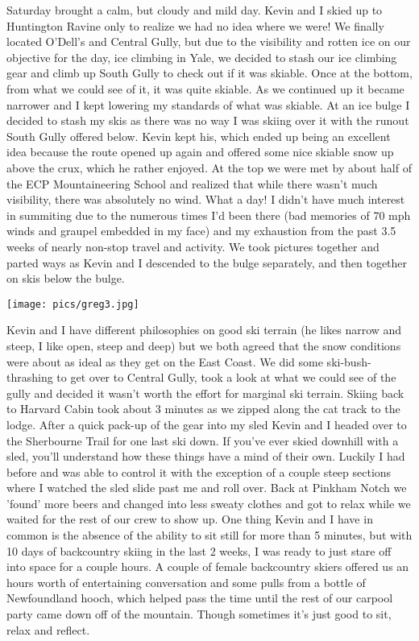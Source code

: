 \documentclass[10pt,a4paper]{article}
\newenvironment{Figure}
  {\par\medskip\noindent\minipage{\linewidth}}
  {\endminipage\par\medskip}
\begin{document}
\begin{multicols}{2}
 
Saturday brought a calm, but cloudy and mild day.  Kevin and I skied up to Huntington Ravine only to realize we had no idea where we were!  We finally located O'Dell's and Central Gully, but due to the visibility and rotten ice on our objective for the day, ice climbing in Yale, we decided to stash our ice climbing gear and climb up South Gully to check out if it was skiable.  Once at the bottom, from what we could see of it, it was quite skiable.  As we continued up it became narrower and I kept lowering my standards of what was skiable.  At an ice bulge I decided to stash my skis as there was no way I was skiing over it with the runout South Gully offered below.  Kevin kept his, which ended up being an excellent idea because the route opened up again and offered some nice skiable snow up above the crux, which he rather enjoyed.  At the top we were met by about half of the ECP Mountaineering School and realized that while there wasn't much visibility, there was absolutely no wind.  What a day!  I didn't have much interest in summiting due to the numerous times I'd been there (bad memories of 70 mph winds and graupel embedded in my face) and my exhaustion from the past 3.5 weeks of nearly non-stop travel and activity.  We took pictures together and parted ways as Kevin and I descended to the bulge separately, and then together on skis below the bulge.  

\begin{Figure}
 \centering
 \texttt{[image: pics/greg3.jpg]}
\end{Figure}

Kevin and I have different philosophies on good ski terrain (he likes narrow and steep, I like open, steep and deep) but we both agreed that the snow conditions were about as ideal as they get on the East Coast.  We did some ski-bush-thrashing to get over to Central Gully, took a look at what we could see of the gully and decided it wasn't worth the effort for marginal ski terrain.  Skiing back to Harvard Cabin took about 3 minutes as we zipped along the cat track to the lodge.  After a quick pack-up of the gear into my sled Kevin and I headed over to the Sherbourne Trail for one last ski down.  If you've ever skied downhill with a sled, you'll understand how these things have a mind of their own.  Luckily I had before and was able to control it with the exception of a couple steep sections where I watched the sled slide past me and roll over.  Back at Pinkham Notch we 'found' more beers and changed into less sweaty clothes and got to relax while we waited for the rest of our crew to show up.  One thing Kevin and I have in common is the absence of the ability to sit still for more than 5 minutes, but with 10 days of backcountry skiing in the last 2 weeks, I was ready to just stare off into space for a couple hours.  A couple of female backcountry skiers offered us an hours worth of entertaining conversation and some pulls from a bottle of Newfoundland hooch, which helped pass the time until the rest of our carpool party came down off of the mountain.  Though sometimes it's just good to sit, relax and reflect.  



\end{multicols}
\end{document}
